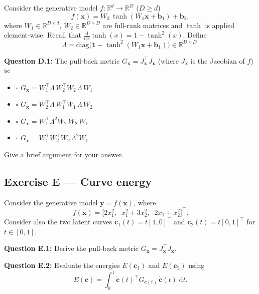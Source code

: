 \documentclass[12pt,a4paper]{article}
\begin{document}
Consider the generative model $f:\mathbb{R}^d\to\mathbb{R}^D$ ($D\geq d$)
\[
  f(\mathbf{x}) = W_2\,\tanh(W_1\mathbf{x}+\mathbf{b}_1)+\mathbf{b}_2, \tag{4}
\]
where $W_1\in\mathbb{R}^{D\times d}$, $W_2\in\mathbb{R}^{D\times D}$ are full-rank matrices and
$\tanh$ is applied element-wise.  Recall that $\frac{\mathrm{d}}{\mathrm{d}x}\tanh(x)=1-\tanh^2(x)$.
Define
\[
  \Lambda = \mathrm{diag}\!\bigl(\mathbf{1} - \tanh^2(W_1\mathbf{x}+\mathbf{b}_1)\bigr)
  \in\mathbb{R}^{D\times D}. \tag{5}
\]

\textbf{Question D.1:} The pull-back metric $G_{\mathbf{x}}=J_{\mathbf{x}}^\top J_{\mathbf{x}}$
(where $J_{\mathbf{x}}$ is the Jacobian of $f$) is:

\begin{itemize}[noitemsep,label={}]
  \item[\textbf{A}] $\square$ \quad $G_{\mathbf{x}} = W_1^\top\Lambda\, W_2^\top W_2\,\Lambda\, W_1$
  \item[\textbf{B}] $\square$ \quad $G_{\mathbf{x}} = W_2^\top\Lambda\, W_1^\top W_1\,\Lambda\, W_2$
  \item[\textbf{C}] $\square$ \quad $G_{\mathbf{x}} = W_1^\top\Lambda^2 W_2^\top W_2\, W_1$
  \item[\textbf{D}] $\square$ \quad $G_{\mathbf{x}} = W_1^\top W_2^\top W_2\,\Lambda^2 W_1$
\end{itemize}

Give a brief argument for your answer.

\vspace{4cm}

\newpage
\subsection*{Exercise E --- Curve energy}

Consider the generative model $\mathbf{y}=f(\mathbf{x})$, where
\[
  f(\mathbf{x}) = \bigl[2x_1^2,\;\; x_1^2+3x_2^2,\;\; 2x_1+x_2^2\bigr]^\top. \tag{6}
\]
Consider also the two latent curves
$\mathbf{c}_1(t) = t[1,0]^\top$ and $\mathbf{c}_2(t) = t[0,1]^\top$ for $t\in[0,1]$.

\textbf{Question E.1:} Derive the pull-back metric $G_{\mathbf{x}}=J_{\mathbf{x}}^\top J_{\mathbf{x}}$.

\vspace{5cm}

\textbf{Question E.2:} Evaluate the energies $E(\mathbf{c}_1)$ and $E(\mathbf{c}_2)$ using
\[
  E(\mathbf{c}) = \int_0^1 \dot{\mathbf{c}}(t)^\top G_{\mathbf{c}(t)}\,\dot{\mathbf{c}}(t)\;\mathrm{d}t. \tag{7}
\]
\end{document}
